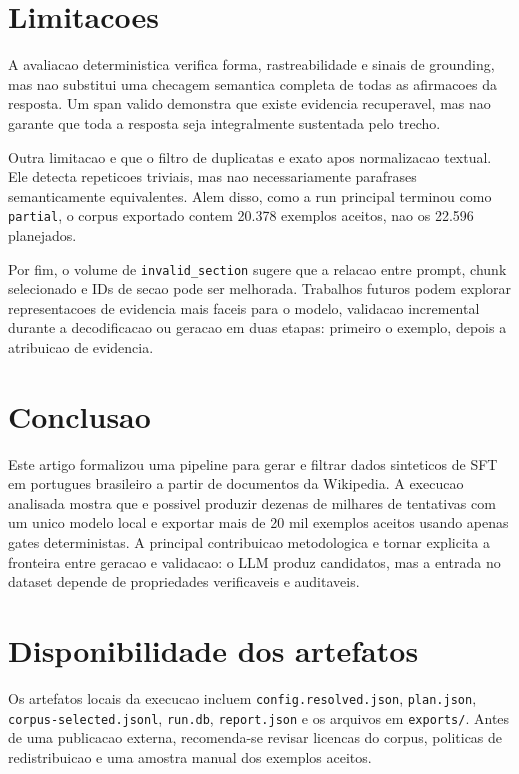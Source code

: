 \documentclass{article}
\begin{document}
\section{Limitacoes}

A avaliacao deterministica verifica forma, rastreabilidade e sinais de
grounding, mas nao substitui uma checagem semantica completa de todas as
afirmacoes da resposta. Um span valido demonstra que existe evidencia
recuperavel, mas nao garante que toda a resposta seja integralmente sustentada
pelo trecho.

Outra limitacao e que o filtro de duplicatas e exato apos normalizacao textual.
Ele detecta repeticoes triviais, mas nao necessariamente parafrases
semanticamente equivalentes. Alem disso, como a run principal terminou como
\texttt{partial}, o corpus exportado contem 20.378 exemplos aceitos, nao os
22.596 planejados.

Por fim, o volume de \texttt{invalid\_section} sugere que a relacao entre
prompt, chunk selecionado e IDs de secao pode ser melhorada. Trabalhos futuros
podem explorar representacoes de evidencia mais faceis para o modelo, validacao
incremental durante a decodificacao ou geracao em duas etapas: primeiro o
exemplo, depois a atribuicao de evidencia.

\section{Conclusao}

Este artigo formalizou uma pipeline para gerar e filtrar dados sinteticos de
SFT em portugues brasileiro a partir de documentos da Wikipedia. A execucao
analisada mostra que e possivel produzir dezenas de milhares de tentativas com
um unico modelo local e exportar mais de 20 mil exemplos aceitos usando apenas
gates deterministas. A principal contribuicao metodologica e tornar explicita a
fronteira entre geracao e validacao: o LLM produz candidatos, mas a entrada no
dataset depende de propriedades verificaveis e auditaveis.

\section*{Disponibilidade dos artefatos}

Os artefatos locais da execucao incluem \texttt{config.resolved.json},
\texttt{plan.json}, \texttt{corpus-selected.jsonl}, \texttt{run.db},
\texttt{report.json} e os arquivos em \texttt{exports/}. Antes de uma
publicacao externa, recomenda-se revisar licencas do corpus, politicas de
redistribuicao e uma amostra manual dos exemplos aceitos.
\end{document}
